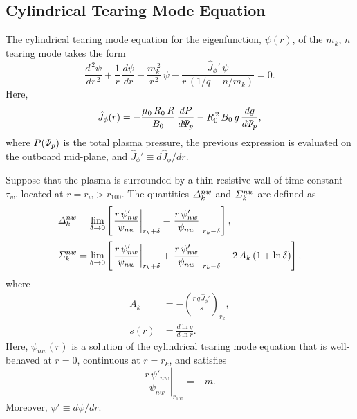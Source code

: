 \documentclass[notitlepage,12pt]{article}
\begin{document}
\subsection{Cylindrical Tearing Mode Equation}
The cylindrical tearing mode equation for the eigenfunction, $\psi(r)$,  of the $m_k$, $n$ tearing mode takes the form
\begin{equation}
\frac{d^{\,2}\psi}{dr^{\,2}}+ \frac{1}{r}\,\frac{d\psi}{dr}-\frac{m_k^{\,2}}{r^{\,2}}\,\psi - \frac{\hat{J}_\phi'\,\psi}{r\,(1/q-n/m_k)}=0.
\end{equation}
Here, 
\begin{equation}
\hat{J}_\phi(r) = - \frac{\mu_0\,R_0\,R}{B_0}\,\frac{dP}{d{\mit\Psi}_p} - R_0^{\,2}\,B_0\,g\,\frac{dg}{d{\mit\Psi}_p},
\end{equation}
where $P({\mit\Psi}_p)$ is the total plasma pressure,  the previous expression is evaluated on the outboard mid-plane, and
$\hat{J}_\phi'\equiv d\hat{J}_\phi/dr$. 

Suppose that the plasma is surrounded by a thin resistive wall of time constant
$\tau_w$, located at $r=r_w>r_{100}$. The quantities ${\mit\Delta}_k^{nw}$ and ${\mit\Sigma}_k^{nw}$
are defined as 
\begin{align}
{\mit\Delta}_k^{nw}&= \lim_{\delta\rightarrow 0}
\left[\left.\frac{r\,\psi'_{nw}}{\psi_{nw}}\right|_{r_k+\delta}
- \left.\frac{r\,\psi'_{nw}}{\psi_{nw}}\right|_{r_k-\delta}\right],\\[0.5ex]
{\mit\Sigma}_k^{nw} &= \lim_{\delta\rightarrow 0}\left[\left.\frac{r\,\psi'_{nw}}{\psi_{nw}}\right|_{r_k+\delta}+ \left.\frac{r\,\psi'_{nw}}{\psi_{nw}}\right|_{r_k-\delta}
-2\,A_k\,(1+\ln\delta)\right],
\end{align}
where 
\begin{align}
A_k &= -\left(\frac{r\,q\,\hat{J}_\phi'}{s}\right)_{r_k},\\[0.5ex]
s(r) &= \frac{d\ln q}{d\ln r}.
\end{align}
Here, $\psi_{nw}(r)$ is a solution of the cylindrical tearing mode equation that is well-behaved at $r=0$,
continuous at $r=r_k$, and satisfies 
\begin{equation}
\left.\frac{r\,\psi'_{nw}}{\psi_{nw}}\right|_{r_{100}} = -m.
\end{equation}
 Moreover, $\psi'\equiv d\psi/dr$. 
\end{document}
